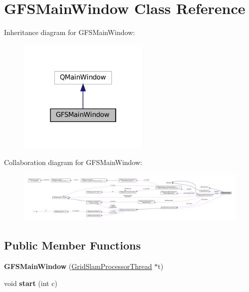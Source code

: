 \hypertarget{classGFSMainWindow}{}\section{G\+F\+S\+Main\+Window Class Reference}
\label{classGFSMainWindow}


Inheritance diagram for G\+F\+S\+Main\+Window\+:
\nopagebreak
\begin{figure}[H]
\begin{center}
\leavevmode
\includegraphics[width=178pt]{classGFSMainWindow__inherit__graph}
\end{center}
\end{figure}


Collaboration diagram for G\+F\+S\+Main\+Window\+:
\nopagebreak
\begin{figure}[H]
\begin{center}
\leavevmode
\includegraphics[width=350pt]{classGFSMainWindow__coll__graph}
\end{center}
\end{figure}
\subsection*{Public Member Functions}
\begin{DoxyCompactItemize}
\item 
\mbox{\label{classGFSMainWindow_a26fd7419fb95d58f2c4ef2b874225ec1}} 
{\bfseries G\+F\+S\+Main\+Window} (\hyperlink{structGridSlamProcessorThread}{Grid\+Slam\+Processor\+Thread} $\ast$t)
\item 
\mbox{\label{classGFSMainWindow_af44736dd886577c50ae9e9bb31bd656e}} 
void {\bfseries start} (int c)
\end{DoxyCompactItemize}
